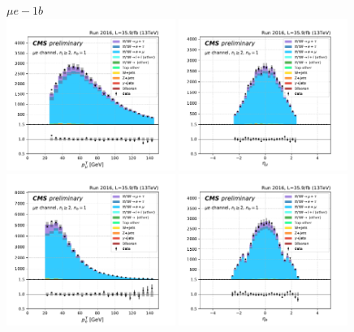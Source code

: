 

\begin{figure}[ht]
    \centering
    $ \mu  e - 1b$ \\
    \includegraphics[width=0.49\textwidth]{chapters/Appendix/sectionPlots/figures/kinematics_pickles/emu/1b/emu_1b_lepton1_pt.pdf}
    \includegraphics[width=0.49\textwidth]{chapters/Appendix/sectionPlots/figures/kinematics_pickles/emu/1b/emu_1b_lepton1_eta.pdf}
    \includegraphics[width=0.49\textwidth]{chapters/Appendix/sectionPlots/figures/kinematics_pickles/emu/1b/emu_1b_lepton2_pt.pdf}
    \includegraphics[width=0.49\textwidth]{chapters/Appendix/sectionPlots/figures/kinematics_pickles/emu/1b/emu_1b_lepton2_eta.pdf}

\end{figure}
